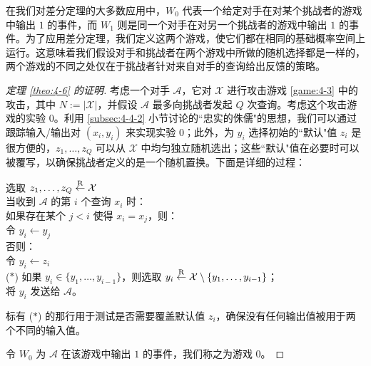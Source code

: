 在我们对差分定理的大多数应用中，$W_0$ 代表一个给定对手在对某个挑战者的游戏中输出 $1$ 的事件，而 $W_1$ 则是同一个对手在对另一个挑战者的游戏中输出 $1$ 的事件。为了应用差分定理，我们定义这两个游戏，使它们都在相同的基础概率空间上运行。这意味着我们假设对手和挑战者在两个游戏中所做的随机选择都是一样的，两个游戏的不同之处仅在于挑战者针对来自对手的查询给出反馈的策略。

\begin{proof}[定理 \ref{theo:4-6} 的证明]
考虑一个对手 $\mathcal{A}$，它对 $\mathcal{X}$ 进行攻击游戏 \ref{game:4-3} 中的攻击，其中 $N:=|\mathcal{X}|$，并假设 $\mathcal{A}$ 最多向挑战者发起 $Q$ 次查询。考虑这个攻击游戏的实验 $0$。利用 \ref{subsec:4-4-2} 小节讨论的``忠实的侏儒"的思想，我们可以通过跟踪输入/输出对 $(x_i,y_i)$ 来实现实验 $0$；此外，为 $y_i$ 选择初始的``默认"值 $z_i$ 是很方便的，$z_1,\dots,z_Q$ 可以从 $\mathcal{X}$ 中均匀独立随机选出；这些``默认"值在必要时可以被覆写，以确保挑战者定义的是一个随机置换。下面是详细的过程：

\vspace{5pt}

\hspace*{5pt} 选取 $z_1,\dots,z_Q\overset{\rm R}\leftarrow\mathcal{X}$\\
\hspace*{26pt} 当收到 $\mathcal{A}$ 的第 $i$ 个查询 $x_i$ 时：\\
\hspace*{50pt} 如果存在某个 $j<i$ 使得 $x_i=x_j$，则：\\
\hspace*{75pt} 令 $y_i\leftarrow y_j$\\
\hspace*{50pt} 否则：\\
\hspace*{75pt} 令 $y_i\leftarrow z_i$\\
\hspace*{1pt} ($*$)
\hspace*{53pt} 如果 $y_i\in\{y_1,\dots,y_{i-1}\}$，则选取 $y_i\overset{\rm R}\leftarrow\mathcal{X}\setminus\{y_1,\dots,y_{i-1}\}$；\\
\hspace*{50pt} 将 $y_i$ 发送给 $\mathcal{A}$。

\vspace{5pt}

标有 ($*$) 的那行用于测试是否需要覆盖默认值 $z_i$，确保没有任何输出值被用于两个不同的输入值。

令 $W_0$ 为 $\mathcal{A}$ 在该游戏中输出 $1$ 的事件，我们称之为游戏 $0$。


\end{proof}
